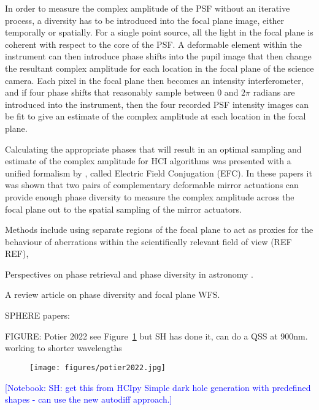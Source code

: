 \documentclass[letterpaper]{ar-1col}
\newcommand{\notebooksuggestion}[1]{\textcolor{blue}{[Notebook: #1]}}
\begin{document}
In order to measure the complex amplitude of the PSF without an iterative process, a diversity has to be introduced into the focal plane image, either temporally or spatially.
%
For a single point source, all the light in the focal plane is coherent with respect to the core of the PSF.
%
A deformable element within the instrument can then introduce phase shifts into the pupil image that then change the resultant complex amplitude for each location in the focal plane of the science camera.
%
Each pixel in the focal plane then becomes an intensity interferometer, and if four phase shifts that reasonably sample between $0$ and $2\pi$ radians are introduced into the instrument, then the four recorded PSF intensity images can be fit to give an estimate of the complex amplitude at each location in the focal plane.

Calculating the appropriate phases that will result in an optimal sampling and estimate of the complex amplitude for HCI algorithms was presented with a unified formalism by \citet{Giveon09,Giveon10}, called Electric Field Conjugation (EFC).
%
In these papers it was shown that two pairs of complementary deformable mirror actuations can provide enough phase diversity to measure the complex amplitude across the focal plane out to the spatial sampling of the mirror actuators.



Methods include using separate regions of the focal plane to act as proxies for the behaviour of aberrations within the scientifically relevant field of view (REF REF), 

Perspectives on phase retrieval and phase diversity in astronomy \citet{Gonsalves14}.

A review article on phase diversity and focal plane WFS. \citep{Fienup13}


SPHERE papers:

FIGURE: Potier 2022 see Figure~\ref{fig:fpwfsclean} but SH has done it, can do a QSS at 900nm. working to shorter wavelengths

\begin{figure}[ht]
  \centering
  \texttt{[image: figures/potier2022.jpg]}
  \caption{}
  \label{fig:fpwfsclean}
\end{figure}

\notebooksuggestion{SH: get this from HCIpy Simple dark hole generation with predefined shapes - can use the new autodiff approach.}
\end{document}
